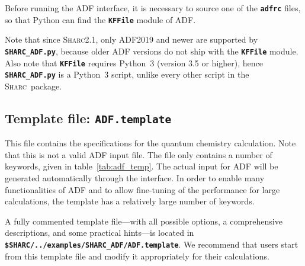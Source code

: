 \documentclass[a4paper,10pt,DIV=15,openany]{scrbook}
\newcommand{\sharc}{\textsc{Sharc}}
\newcommand{\ttt}[1]{\textbf{\texttt{#1}}}
\begin{document}
Before running the ADF interface, it is necessary to source one of the \ttt{adfrc} files, so that Python can find the \ttt{KFFile} module of ADF.

Note that since \sharc2.1, only ADF2019 and newer are supported by \ttt{SHARC\_ADF.py}, because older ADF versions do not ship with the \ttt{KFFile} module.
Also note that \ttt{KFFile} requires Python~3 (version 3.5 or higher), hence \ttt{SHARC\_ADF.py} is a Python~3 script, unlike every other script in the \sharc\ package.




\subsection{Template file: \ttt{ADF.template}}

This file contains the specifications for the quantum chemistry calculation. Note that this is not a valid \textsc{ADF} input file. The file only contains a number of keywords, given in table~\ref{tab:adf_temp}. The actual input for \textsc{ADF} will be generated automatically through the interface.
In order to enable many functionalities of ADF and to allow fine-tuning of the performance for large calculations, the template has a relatively large number of keywords.

A fully commented template file---with all possible options, a comprehensive descriptions, and some practical hints---is located in \ttt{\$SHARC/../examples/SHARC\_ADF/ADF.template}.
We recommend that users start from this template file and modify it appropriately for their calculations.
\end{document}
